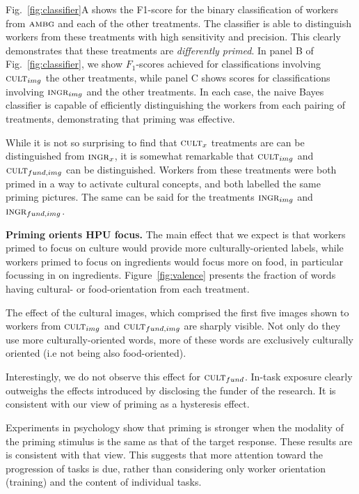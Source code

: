 \documentclass[letterpaper]{article}
\begin{document}
Fig.~\ref{fig:classifier}A shows the F1-score for the binary classification 
of workers from $\textsc{ambg}$ and each of the other treatments.  The 
classifier is able to distinguish workers from these treatments with high
sensitivity and precision.  This clearly demonstrates that these treatments
are \textit{differently primed}.  In panel B of Fig.~\ref{fig:classifier}, 
we show $F_1$-scores achieved for classifications involving $\textsc{cult}_{img}$ the other treatments, while panel C shows scores for classifications 
involving $\textsc{ingr}_{img}$ and the other treatments.  In each case, 
the naive Bayes classifier is capable of efficiently distinguishing the
workers from each pairing of treatments, demonstrating that priming was effective.

While it is not so surprising to find that $\textsc{cult}_x$ treatments are 
can be distinguished from $\textsc{ingr}_x$, it is somewhat remarkable that
$\textsc{cult}_{img}$ and $\textsc{cult}_{fund, img}$ can be distinguished.
Workers from these treatments were both primed in a way to activate cultural concepts, and 
both labelled the same priming pictures.  The same can be said for the 
treatments $\textsc{ingr}_{img}$ and $\textsc{ingr}_{fund, img}$.


\textbf{Priming orients HPU focus.}
The main effect that we expect is that workers primed to focus on culture
would provide more culturally-oriented labels, while workers primed to focus
on ingredients would focus more on food, in particular focussing in on 
ingredients.  Figure~\ref{fig:valence} presents the fraction of words having
cultural- or food-orientation from each treatment.

The effect of the cultural images, which comprised the first five images shown
to workers from $\textsc{cult}_{img}$ and $\textsc{cult}_{fund, img}$ are
sharply visible.  Not only do they use more culturally-oriented words, more
of these words are exclusively culturally oriented (i.e not being also 
food-oriented). 

Interestingly, we do not observe this effect for $\textsc{cult}_{fund}$.
In-task exposure clearly outweighs the effects introduced by
disclosing the funder of the research.  It is consistent with our view of 
priming as a hysteresis effect. 

Experiments in psychology show that priming is stronger when the modality of
the priming stimulus is the same as that of the target response.  These
results are is consistent with that view.  This suggests that more attention
toward the progression of tasks is due, rather than considering only worker
orientation (training) and the content of individual tasks.
\end{document}
